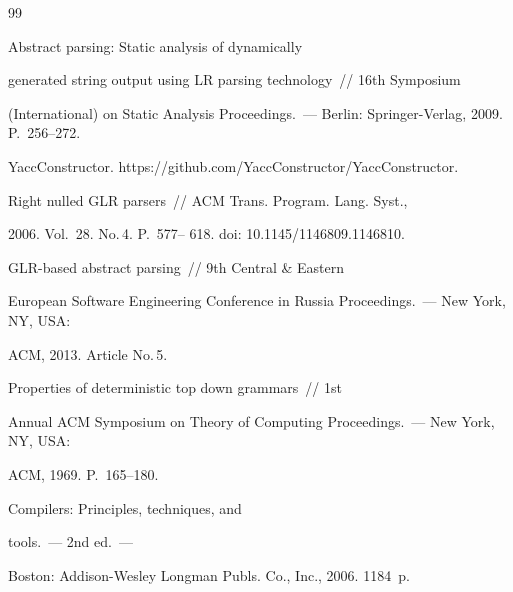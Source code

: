 {\small\frenchspacing


{%




\begin{thebibliography}{99}




   Abstract parsing: Static analysis of dynamically


generated string output using LR parsing technology~/\!\!/ 16th Symposium


(International) on  Static Analysis Proceedings.~--- Berlin: Springer-Verlag, 2009. P.~256--272.




  YaccConstructor. {\sf https://github.com/YaccConstructor/YaccConstructor}.




   Right nulled GLR parsers~/\!\!/ ACM Trans. Program. Lang. Syst.,


2006. Vol.~28. No.\,4. P.~577-- 618. doi: 10.1145/1146809.1146810.




   GLR-based abstract parsing~/\!\!/ 9th Central \& Eastern


European Software Engineering Conference in Russia Proceedings.~--- New York, NY, USA:


ACM, 2013. Article No.\,5.




   Properties of deterministic top down grammars~/\!\!/ 1st


Annual ACM Symposium on Theory of Computing Proceedings.~--- New York, NY, USA:


ACM, 1969. P.~165--180.





\pagebreak










   Compilers: Principles, techniques, and


tools.~--- 2nd ed.~---


Boston: Addison-Wesley Longman Publs. Co., Inc., 2006. 1184~p.



\end{thebibliography}}}
